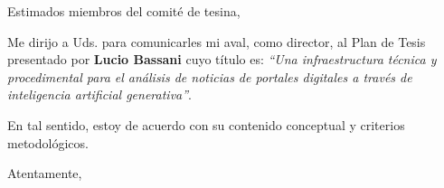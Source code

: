 \documentclass[11pt]{letter}
\date{Rosario, 9 de octubre de 2023}
\begin{document}
\begin{letter}{}



\opening{Estimados miembros del comité de tesina,}



\hspace{5 cm} Me dirijo a Uds. para comunicarles mi aval, como director,  al Plan de Tesis presentado por \textbf{Lucio Bassani} cuyo título es: \textit{“Una infraestructura técnica y procedimental para el análisis de noticias de portales digitales a través de inteligencia artificial generativa”}.


\hspace{5cm} En tal sentido, estoy de acuerdo con su contenido conceptual y criterios metodológicos.


\closing{Atentamente,}


\end{letter}
\end{document}
